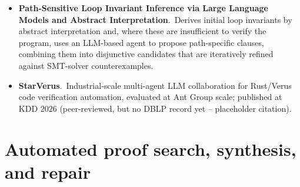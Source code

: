 \documentclass[natbib=false,acmsmall,nonacm,11pt]{acmart}
\begin{document}
\begin{itemize}
\item \textbf{Path-Sensitive Loop Invariant Inference via Large Language Models and Abstract Interpretation}.~Derives initial loop invariants by abstract interpretation and, where these are insufficient to verify the program, uses an LLM-based agent to propose path-specific clauses, combining them into disjunctive candidates that are iteratively refined against SMT-solver counterexamples.~\cite{Fan_2026}
\item \textbf{StarVerus}.~Industrial-scale multi-agent LLM collaboration for Rust/Verus code verification automation, evaluated at Ant Group scale; published at KDD 2026 (peer-reviewed, but no DBLP record yet -- placeholder citation).~\cite{placeholder_jiang2026_starverus}
\end{itemize}

\section{Automated proof search, synthesis, and repair}\label{sec:mechanised-proving}
\end{document}
